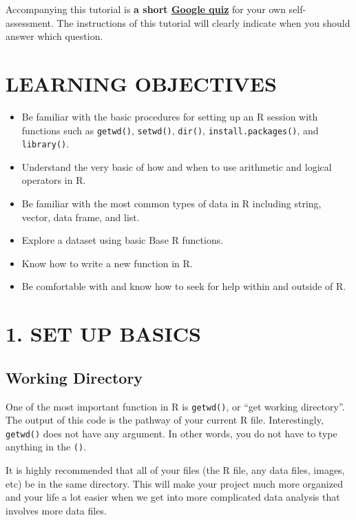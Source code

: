 \documentclass[
]{book}
\providecommand{\tightlist}{%
  \setlength{\itemsep}{0pt}\setlength{\parskip}{0pt}}
\begin{document}
Accompanying this tutorial is \textbf{a short \href{https://forms.gle/P5x4pRK39xrA9EJR9}{Google quiz}} for your own self-assessment. The instructions of this tutorial will clearly indicate when you should answer which question.

\hypertarget{learning-objectives-1}{%
\section{LEARNING OBJECTIVES}\label{learning-objectives-1}}

\begin{itemize}
\tightlist
\item
  Be familiar with the basic procedures for setting up an R session with functions such as \texttt{getwd()}, \texttt{setwd()}, \texttt{dir()}, \texttt{install.packages()}, and \texttt{library()}.
\item
  Understand the very basic of how and when to use arithmetic and logical operators in R.
\item
  Be familiar with the most common types of data in R including string, vector, data frame, and list.
\item
  Explore a dataset using basic Base R functions.
\item
  Know how to write a new function in R.
\item
  Be comfortable with and know how to seek for help within and outside of R.
\end{itemize}

\hypertarget{set-up-basics}{%
\section{1. SET UP BASICS}\label{set-up-basics}}

\hypertarget{working-directory}{%
\subsection{Working Directory}\label{working-directory}}

One of the most important function in R is \texttt{getwd()}, or ``get working directory''. The output of this code is the pathway of your current R file. Interestingly, \texttt{getwd()} does not have any argument. In other words, you do not have to type anything in the \texttt{()}.

It is highly recommended that all of your files (the R file, any data files, images, etc) be in the same directory. This will make your project much more organized and your life a lot easier when we get into more complicated data analysis that involves more data files.
\end{document}
